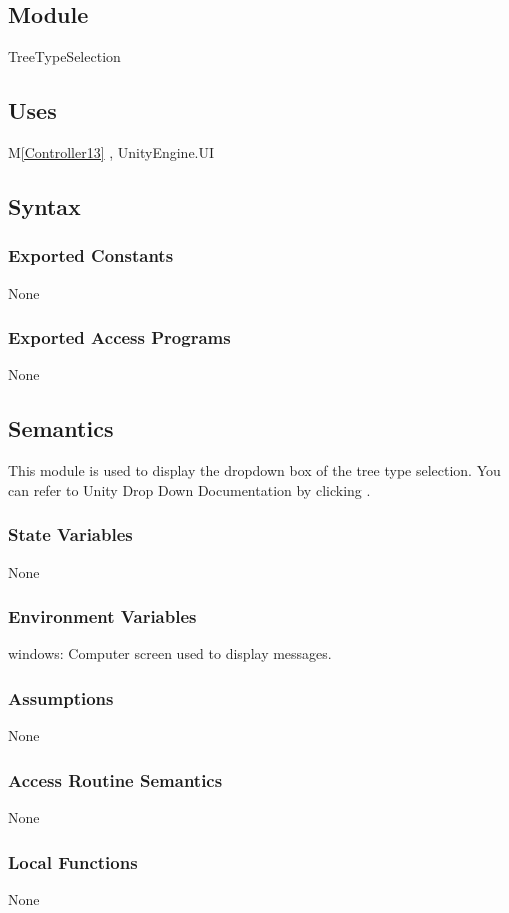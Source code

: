 \documentclass[12pt, titlepage]{article}
\newcommand{\mref}[1]{M\ref{#1}}
\begin{document}
\subsection{Module}

TreeTypeSelection

\subsection{Uses}

\mref{Controller13} , UnityEngine.UI

\subsection{Syntax}

\subsubsection{Exported Constants}
None
\subsubsection{Exported Access Programs}
None

\subsection{Semantics}
This module is used to display the dropdown box of the tree type
selection. You can refer to Unity Drop Down Documentation 
by clicking \dref.

\subsubsection{State Variables}
None
\subsubsection{Environment Variables}
windows: Computer screen used to display messages.
\subsubsection{Assumptions}
None
\subsubsection{Access Routine Semantics}
None
\subsubsection{Local Functions}
None
\end{document}
